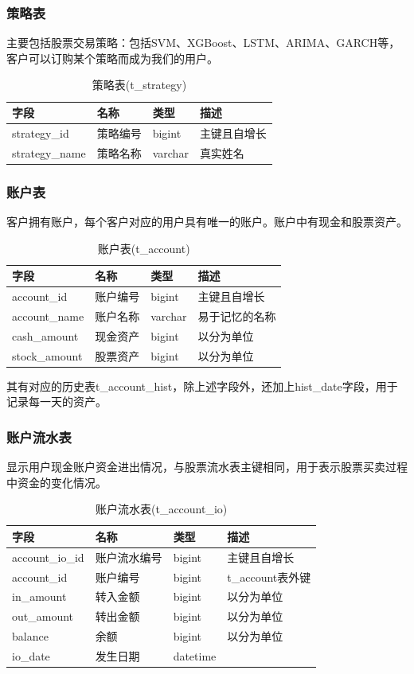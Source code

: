 \documentclass{article}
\begin{document}
\subsubsection{策略表}
主要包括股票交易策略：包括SVM、XGBoost、LSTM、ARIMA、GARCH等，客户可以订购某个策略而成为我们的用户。
\begin{table}[h]
    \caption{策略表(t\_strategy)}
    \label{t000002}
    \begin{tabular}{|p{2cm}|p{3cm}|p{2cm}|p{5cm}|} \hline
        字段 & 名称 & 类型 & 描述 \\ \hline 
        strategy\_id & 策略编号 & bigint & 主键且自增长 \\ \hline
        strategy\_name & 策略名称 & varchar & 真实姓名 \\ \hline
    \end{tabular}
\end{table}
\subsubsection{账户表}
客户拥有账户，每个客户对应的用户具有唯一的账户。账户中有现金和股票资产。
\begin{table}[h]
    \caption{账户表(t\_account)}
    \label{t000003}
    \begin{tabular}{|p{2cm}|p{3cm}|p{2cm}|p{5cm}|} \hline
        字段 & 名称 & 类型 & 描述 \\ \hline 
        account\_id & 账户编号 & bigint & 主键且自增长 \\ \hline
        account\_name & 账户名称 & varchar & 易于记忆的名称 \\ \hline
        cash\_amount & 现金资产 & bigint & 以分为单位 \\ \hline
        stock\_amount & 股票资产 & bigint & 以分为单位 \\ \hline
    \end{tabular}
\end{table}
其有对应的历史表t\_account\_hist，除上述字段外，还加上hist\_date字段，用于记录每一天的资产。
\subsubsection{账户流水表}
显示用户现金账户资金进出情况，与股票流水表主键相同，用于表示股票买卖过程中资金的变化情况。
\begin{table}[h]
    \caption{账户流水表(t\_account\_io)}
    \label{t000004}
    \begin{tabular}{|p{2cm}|p{3cm}|p{2cm}|p{5cm}|} \hline
        字段 & 名称 & 类型 & 描述 \\ \hline 
        account\_io\_id & 账户流水编号 & bigint & 主键且自增长 \\ \hline
        account\_id & 账户编号 & bigint & t\_account表外键 \\ \hline
        in\_amount & 转入金额 & bigint & 以分为单位 \\ \hline
        out\_amount & 转出金额 & bigint & 以分为单位 \\ \hline
        balance & 余额 & bigint & 以分为单位  \\ \hline
        io\_date & 发生日期 & datetime & \\ \hline
    \end{tabular}
\end{table}
\end{document}
